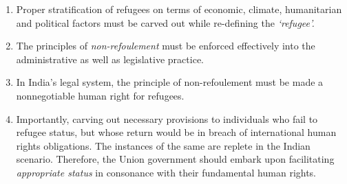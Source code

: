 \begin{multicols}{2}
\begin{enumerate}[label=$\bullet$]
\item Proper stratification of refugees on terms of economic, climate, humanitarian and
political factors must be carved out while re-defining the \textit{‘refugee’.}

\item The principles of \textit{non-refoulement} must be enforced effectively into the administrative
as well as legislative practice.

\item In India's legal system, the principle of non-refoulement must be made a nonnegotiable human right for refugees.

\item Importantly, carving out necessary provisions to individuals who fail to refugee status,
but whose return would be in breach of international human rights obligations. The
instances of the same are replete in the Indian scenario. Therefore, the Union
government should embark upon facilitating \textit{appropriate status} in consonance with
their fundamental human rights.
\end{enumerate}

\end{multicols}
